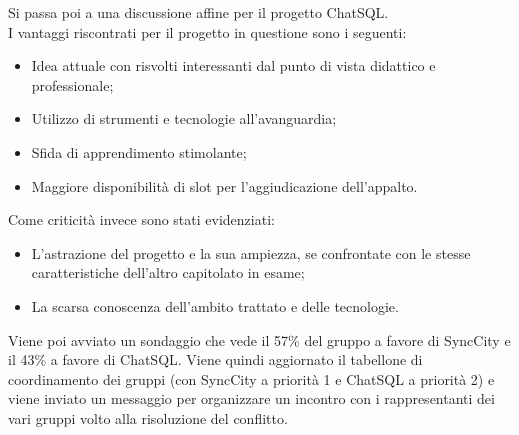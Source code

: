 Si passa poi a una discussione affine per il progetto ChatSQL.\\
I vantaggi riscontrati per il progetto in questione sono i seguenti:
\begin{itemize}
	\item Idea attuale con risvolti interessanti dal punto di vista didattico e professionale;
	\item Utilizzo di strumenti e tecnologie all’avanguardia;
	\item Sfida di apprendimento stimolante;
	\item Maggiore disponibilità di slot per l’aggiudicazione dell’appalto.	
\end{itemize}
Come criticità invece sono stati evidenziati:
\begin{itemize}
	\item L'astrazione del progetto e la sua ampiezza, se confrontate con le stesse caratteristiche dell'altro capitolato in esame;
	\item La scarsa conoscenza dell’ambito trattato e delle tecnologie.	
\end{itemize}
Viene poi avviato un sondaggio che vede il 57\% del gruppo a favore di SyncCity e il 43\% a favore di ChatSQL. Viene quindi aggiornato il tabellone di coordinamento dei gruppi (con SyncCity a priorità 1 e ChatSQL a priorità 2) e viene inviato un messaggio per organizzare un incontro con i rappresentanti dei vari gruppi volto alla risoluzione del conflitto.

